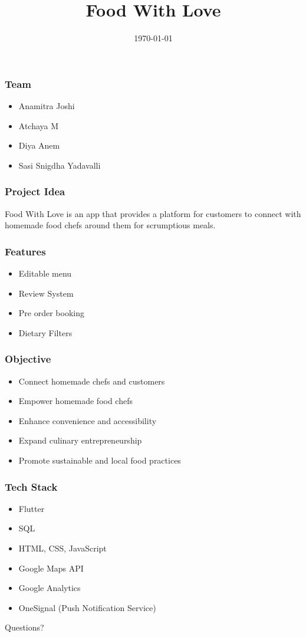 \documentclass{beamer}
\title{Food With Love}
\date{\today}
\begin{document}
\begin{frame}
	\titlepage
\end{frame}
\begin{frame}
	\frametitle{Team}
\begin{itemize}
	\item Anamitra Joshi
	\item Atchaya M
	\item Diya Anem
	\item Sasi Snigdha Yadavalli
    \end{itemize}
\end{frame}
\begin{frame}
	\frametitle{Project Idea}
Food With Love is an app that provides a platform for customers to connect with homemade food chefs around them for scrumptious meals. 
\end{frame}
\begin{frame}
	\frametitle{Features}
\begin{itemize}
	\item Editable menu
	\item Review System
	\item Pre order booking
	\item Dietary Filters
    \end{itemize}
\end{frame}
\begin{frame}
	\frametitle{Objective}
\begin{itemize}
	\item Connect homemade chefs and customers
	\item Empower homemade food chefs
	\item Enhance convenience and accessibility
	\item Expand culinary entrepreneurship
	\item Promote sustainable and local food practices
    \end{itemize}
\end{frame}
\begin{frame}
	\frametitle{Tech Stack}
\begin{itemize}
	\item Flutter
	\item SQL
	\item HTML, CSS, JavaScript
	\item Google Maps API
	\item Google Analytics
	\item OneSignal (Push Notification Service)
    \end{itemize} 
\end{frame}
\begin{frame}
	Questions?
\end{frame}
\end{document}

